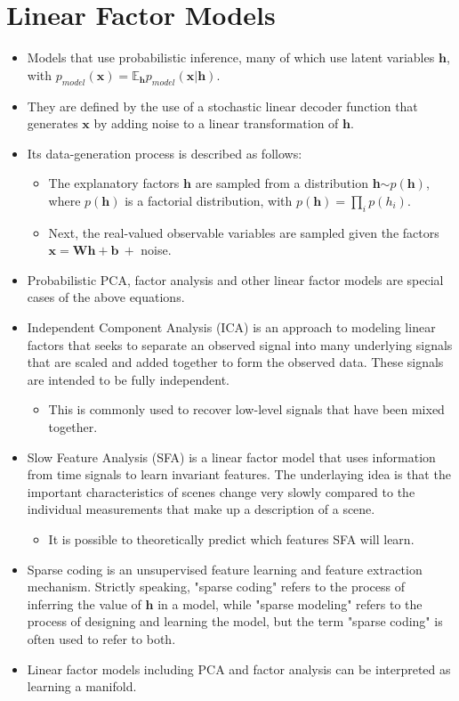 \documentclass{article}
\begin{document}
\section{Linear Factor Models}
\begin{itemize}
\item Models that use probabilistic inference, many of which use latent variables \(\boldsymbol{h}\), with \(p_{model}(\boldsymbol{x}) = \mathbb{E}_{\boldsymbol{h}}p_{model}(\boldsymbol{x} | \boldsymbol{h})\).
\item They are defined by the use of a stochastic linear decoder function that generates \(\boldsymbol{x}\) by adding noise to a linear transformation of \(\boldsymbol{h}\).
\item Its data-generation process is described as follows:
\begin{itemize}
\item The explanatory factors \(\boldsymbol{h}\) are sampled from a distribution \textbf{h}\( \sim p(\boldsymbol{h})\), where \( p(\boldsymbol{h})\) is a factorial distribution, with \( p(\boldsymbol{h}) = \prod_{i}p(h_i)\).
\item Next, the real-valued observable variables are sampled given the factors \(\boldsymbol{x} = \boldsymbol{Wh} + \boldsymbol{b}\ +\) noise.
\end{itemize}
\item Probabilistic PCA, factor analysis and other linear factor models are special cases of the above equations.
\item Independent Component Analysis (ICA) is an approach to modeling linear factors that seeks to separate an observed signal into many underlying signals that are scaled and added together to form the observed data. These signals are intended to be fully independent.
\begin{itemize}
\item This is commonly used to recover low-level signals that have been mixed together.
\end{itemize}
\item Slow Feature Analysis (SFA) is a linear factor model that uses information from time signals to learn invariant features. The underlaying idea is that the important characteristics of scenes change very slowly compared to the individual measurements that make up a description of a scene.
\begin{itemize}
\item It is possible to theoretically predict which features SFA will learn.
\end{itemize}
\item Sparse coding is an unsupervised feature learning and feature extraction mechanism. Strictly speaking, "sparse coding" refers to the process of inferring the value of \(\boldsymbol{h}\) in a model, while "sparse modeling" refers to the process of designing and learning the model, but the term "sparse coding" is often used to refer to both.
\item Linear factor models including PCA and factor analysis can be interpreted as learning a manifold.
\end{itemize}
\end{document}
